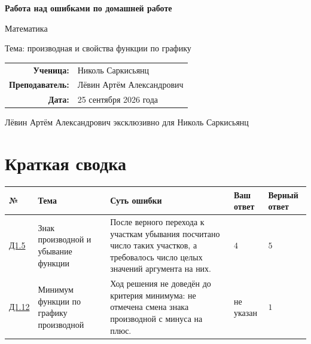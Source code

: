 \documentclass[a4paper,12pt]{article}
\begin{document}
\begin{titlepage}
  \centering
  \vspace*{0.16\textheight}

  {\LARGE\bfseries Работа над ошибками по домашней работе\par}
  \vspace{1.6em}
  {\large Математика\par}
  \vspace{0.45em}
  {\large Тема: производная и свойства функции по графику\par}

  \vspace{2.4em}
  \begin{tabular}{@{}rl@{}}
    \textbf{Ученица:} & Николь Саркисьянц \\
    \textbf{Преподаватель:} & Лёвин Артём Александрович \\
    \textbf{Дата:} & 25 сентября 2026 года
  \end{tabular}

  \vfill
  {\small Лёвин Артём Александрович эксклюзивно для Николь Саркисьянц\par}
  \vspace{0.8em}
  \vspace*{0.7cm}
\end{titlepage}

\section*{Краткая сводка}
\small
\begin{tabularx}{\linewidth}{@{}>{\raggedright\arraybackslash}p{1.4cm} Y Y >{\raggedright\arraybackslash}p{2.0cm} >{\raggedright\arraybackslash}p{2.2cm}@{}}
\toprule
\textbf{№} & \textbf{Тема} & \textbf{Суть ошибки} & \textbf{Ваш ответ} & \textbf{Верный ответ} \\
\midrule
\hyperref[task:D1.5]{Д1.5}
& Знак производной и убывание функции
& После верного перехода к участкам убывания посчитано число таких участков, а требовалось число целых значений аргумента на них.
& $4$
& $5$ \\
\addlinespace
\hyperref[task:D1.12]{Д1.12}
& Минимум функции по графику производной
& Ход решения не доведён до критерия минимума: не отмечена смена знака производной с минуса на плюс.
& не указан
& $1$ \\
\bottomrule
\end{tabularx}
\normalsize
\end{document}
